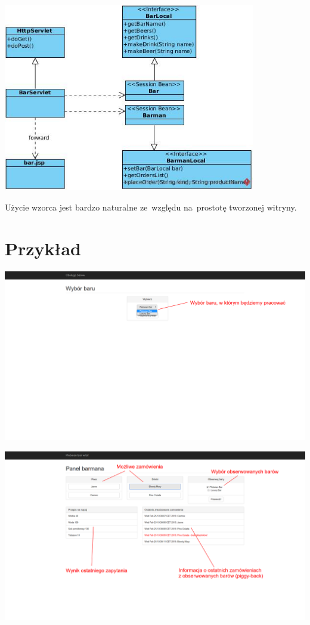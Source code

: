 \documentclass[11pt]{aghdpl}
\begin{document}
\begin{center}
 \includegraphics[width=11cm]{kontroler}
\end{center}

Użycie wzorca jest bardzo naturalne ze~względu na~prostotę tworzonej witryny.

\chapter{Przykład}
\begin{center}
 \includegraphics[width=16cm]{zrzut1}
\end{center}
\begin{center}
 \includegraphics[width=16cm]{zrzut2}
\end{center}
\end{document}
